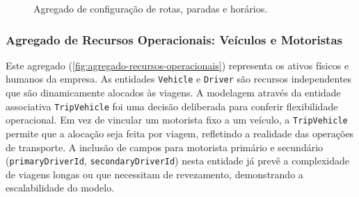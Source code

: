 \begin{figure}[H]
  \caption{Agregado de configuração de rotas, paradas e horários.}
  \label{fig:agregado-configuracao}
\end{figure}

\subsubsection*{Agregado de Recursos Operacionais: Veículos e Motoristas}

Este agregado (\autoref{fig:agregado-recursos-operacionais}) representa os ativos físicos e humanos da empresa. As entidades \texttt{Vehicle} e \texttt{Driver} são recursos independentes que são dinamicamente alocados às viagens. A modelagem através da entidade associativa \texttt{TripVehicle} foi uma decisão deliberada para conferir flexibilidade operacional. Em vez de vincular um motorista fixo a um veículo, a \texttt{TripVehicle} permite que a alocação seja feita por viagem, refletindo a realidade das operações de transporte. A inclusão de campos para motorista primário e secundário (\texttt{primaryDriverId}, \texttt{secondaryDriverId}) nesta entidade já prevê a complexidade de viagens longas ou que necessitam de revezamento, demonstrando a escalabilidade do modelo.

